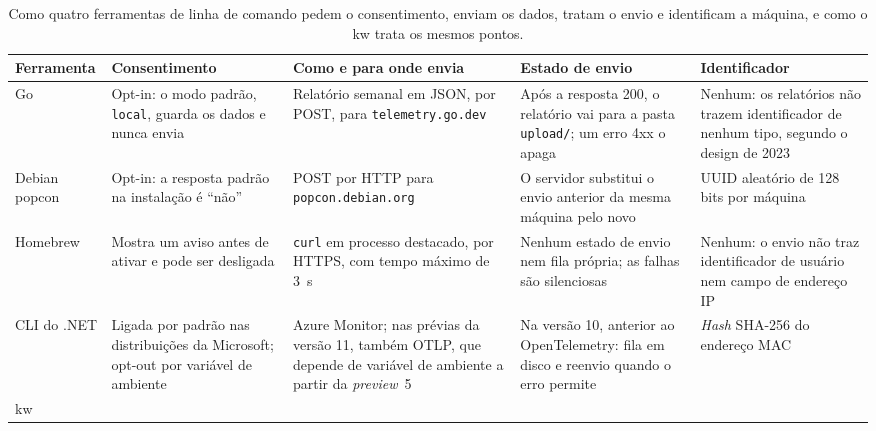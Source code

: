 \begin{table}[!ht]
  \centering
  \footnotesize
  \setlength{\tabcolsep}{4pt}
  \begin{threeparttable}
    \caption{Como quatro ferramentas de linha de comando pedem o
      consentimento, enviam os dados, tratam o envio e identificam a
      máquina, e como o kw trata os mesmos pontos.}
    \label{tab:precedentes}
    \begin{tabular}{@{}>{\raggedright\arraybackslash}p{1.7cm}
                      >{\raggedright\arraybackslash}p{3.0cm}
                      >{\raggedright\arraybackslash}p{3.0cm}
                      >{\raggedright\arraybackslash}p{3.4cm}
                      >{\raggedright\arraybackslash}p{2.9cm}@{}}
      \toprule
      Ferramenta & Consentimento & Como e para onde envia & Estado de envio
        & Identificador \\
      \midrule
      Go
        & Opt-in: o modo padrão, \texttt{local}, guarda os dados e nunca envia
        & Relatório semanal em JSON, por POST, para
          \texttt{telemetry.go.dev}
        & Após a resposta 200, o relatório vai para a pasta
          \texttt{upload/}; um erro 4xx o apaga
        & Nenhum: os relatórios não trazem identificador de nenhum tipo,
          segundo o design de 2023 \\
      \addlinespace
      Debian popcon
        & Opt-in: a resposta padrão na instalação é ``não''
        & POST por HTTP para \texttt{popcon.\allowbreak debian.org}
        & O servidor substitui o envio anterior da mesma máquina pelo novo
        & UUID aleatório de 128 bits por máquina \\
      \addlinespace
      Homebrew
        & Mostra um aviso antes de ativar e pode ser desligada
        & \texttt{curl} em processo destacado, por HTTPS, com tempo máximo de
          3~s
        & Nenhum estado de envio nem fila própria; as falhas são silenciosas
        & Nenhum: o envio não traz identificador de usuário nem campo de
          endereço IP \\
      \addlinespace
      CLI do .NET
        & Ligada por padrão nas distribuições da Microsoft; \mbox{opt-out} por
          variável de ambiente
        & Azure Monitor; nas prévias da versão 11, também OTLP, que depende de
          variável de ambiente a partir da \textit{preview}~5
        & Na versão 10, anterior ao OpenTelemetry: fila em disco e reenvio
          quando o erro permite
        & \textit{Hash} SHA-256 do endereço MAC \\
      \midrule
      kw

\end{tabular}
\end{threeparttable}
\end{table}

